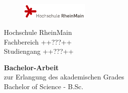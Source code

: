 ﻿%
\pagestyle{empty} %

\begin{figure}[t]
	\flushright
	\includegraphics[width=0.3\textwidth]{media/logo_hsrm}
\end{figure}


\begin{center}
Hochschule RheinMain \\
Fachbereich ++???++ \\
Studiengang ++???++

\vspace{30 pt}

{\Large \textbf{Bachelor-Arbeit}} \\
zur Erlangung des akademischen Grades \\ 
Bachelor of Science - B.Sc.

\vspace{50 pt}

\begin{spacing}{1.2}
\LARGE \textbf{\thetitle}
\end{spacing}
%
\end{center}

\vfill %

